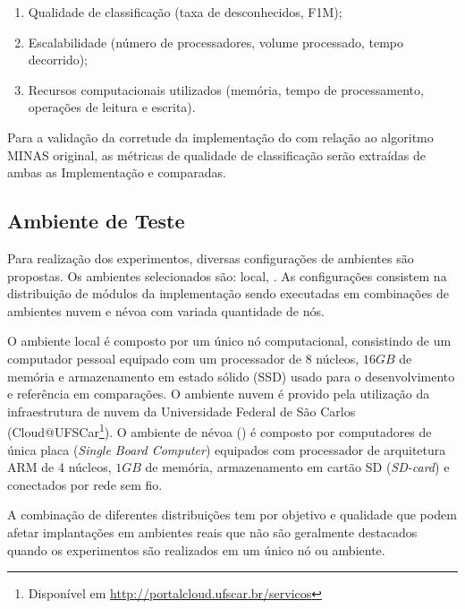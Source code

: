 \begin{enumerate}[label={\alph*)}]
  \item Qualidade de classificação (taxa de desconhecidos, F1M);
  \item Escalabilidade (número de processadores, volume processado, tempo
  decorrido);
  \item Recursos computacionais utilizados (memória, tempo de processamento,
  operações de leitura e escrita).
\end{enumerate}

Para a validação da corretude da implementação do \mfog com relação ao algoritmo
MINAS original, as métricas de qualidade de classificação serão extraídas de
ambas as Implementação e comparadas.


\subsection{Ambiente de Teste}

Para realização dos experimentos, diversas configurações de ambientes são
propostas.
Os ambientes selecionados são: local, 
.
As configurações consistem na distribuição de módulos da implementação \mfog
sendo executadas em combinações de ambientes nuvem e névoa com variada
quantidade de nós.

O ambiente local é composto por um único nó computacional, consistindo de um
computador pessoal equipado com um processador de 8 núcleos, $16GB$ de memória e
armazenamento em estado sólido (SSD) usado para o desenvolvimento e referência
em comparações.
O ambiente nuvem é provido pela utilização da infraestrutura de nuvem da
Universidade Federal de São Carlos (Cloud{@}UFSCar\footnote{Disponível em
\url{http://portalcloud.ufscar.br/servicos}}).
O ambiente de névoa (\fog) é composto por computadores de única placa
(\emph{Single Board Computer}) equipados com processador de arquitetura ARM de 4
núcleos, $1GB$ de memória, armazenamento em cartão SD (\emph{SD-card}) e
conectados por rede sem fio.

A combinação de diferentes distribuições tem por objetivo  e qualidade que podem afetar implantações em ambientes reais que não
são geralmente destacados quando os experimentos são realizados em um único
nó ou ambiente.

